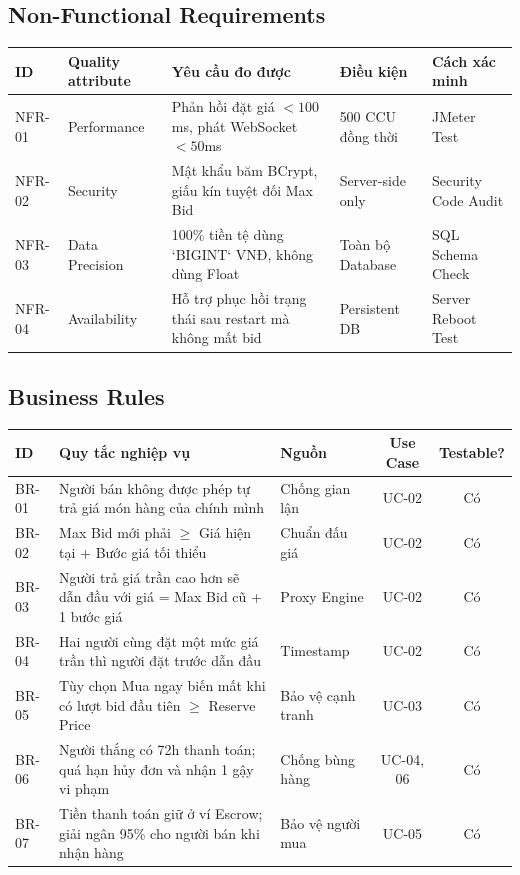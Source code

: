 \documentclass[11pt,a4paper]{article}
\begin{document}
\subsection{Non-Functional Requirements}
\begin{table}[H]
    \centering
    \small
    \begin{tabularx}{\textwidth}{|l|l|X|l|l|}
        \hline
        \textbf{ID} & \textbf{Quality attribute} & \textbf{Yêu cầu đo được} & \textbf{Điều kiện} & \textbf{Cách xác minh} \\ \hline
        NFR-01 & Performance & Phản hồi đặt giá $< 100$ms, phát WebSocket $< 50$ms & 500 CCU đồng thời & JMeter Test \\ \hline
        NFR-02 & Security & Mật khẩu băm BCrypt, giấu kín tuyệt đối Max Bid & Server-side only & Security Code Audit \\ \hline
        NFR-03 & Data Precision & 100\% tiền tệ dùng `BIGINT` VNĐ, không dùng Float & Toàn bộ Database & SQL Schema Check \\ \hline
        NFR-04 & Availability & Hỗ trợ phục hồi trạng thái sau restart mà không mất bid & Persistent DB & Server Reboot Test \\ \hline
    \end{tabularx}
\end{table}

\subsection{Business Rules}
\begin{table}[H]
    \centering
    \small
    \begin{tabularx}{\textwidth}{|l|X|l|c|c|}
        \hline
        \textbf{ID} & \textbf{Quy tắc nghiệp vụ} & \textbf{Nguồn} & \textbf{Use Case} & \textbf{Testable?} \\ \hline
        BR-01 & Người bán không được phép tự trả giá món hàng của chính mình & Chống gian lận & UC-02 & Có \\ \hline
        BR-02 & Max Bid mới phải $\ge$ Giá hiện tại + Bước giá tối thiểu & Chuẩn đấu giá & UC-02 & Có \\ \hline
        BR-03 & Người trả giá trần cao hơn sẽ dẫn đầu với giá = Max Bid cũ + 1 bước giá & Proxy Engine & UC-02 & Có \\ \hline
        BR-04 & Hai người cùng đặt một mức giá trần thì người đặt trước dẫn đầu & Timestamp & UC-02 & Có \\ \hline
        BR-05 & Tùy chọn Mua ngay biến mất khi có lượt bid đầu tiên $\ge$ Reserve Price & Bảo vệ cạnh tranh & UC-03 & Có \\ \hline
        BR-06 & Người thắng có 72h thanh toán; quá hạn hủy đơn và nhận 1 gậy vi phạm & Chống bùng hàng & UC-04, 06 & Có \\ \hline
        BR-07 & Tiền thanh toán giữ ở ví Escrow; giải ngân 95\% cho người bán khi nhận hàng & Bảo vệ người mua & UC-05 & Có \\ \hline
    \end{tabularx}
\end{table}
\end{document}
